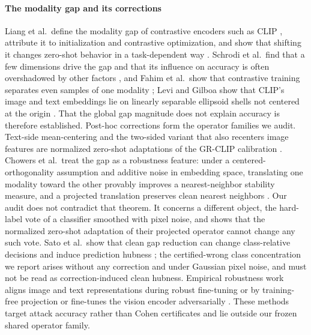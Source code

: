 \paragraph{The modality gap and its corrections}
Liang et al.\ define the modality gap of contrastive encoders such as CLIP \cite{radford2021clip}, attribute it to initialization and contrastive optimization, and show that shifting it changes zero-shot behavior in a task-dependent way \cite{liang2022mind}. Schrodi et al.\ find that a few dimensions drive the gap and that its influence on accuracy is often overshadowed by other factors \cite{schrodi2025twoeffects}, and Fahim et al.\ show that contrastive training separates even samples of one modality \cite{fahim2024contrastive}; Levi and Gilboa show that CLIP's image and text embeddings lie on linearly separable ellipsoid shells not centered at the origin \cite{levi2025double}. That the global gap magnitude does not explain accuracy is therefore established. Post-hoc corrections form the operator families we audit. Text-side mean-centering and the two-sided variant that also recenters image features are normalized zero-shot adaptations of the GR-CLIP calibration \cite{li2025closing}. Chowers et al.\ treat the gap as a robustness feature: under a centered-orthogonality assumption and additive noise in embedding space, translating one modality toward the other provably improves a nearest-neighbor stability measure, and a projected translation preserves clean nearest neighbors \cite{chowers2026bug}. Our audit does not contradict that theorem. It concerns a different object, the hard-label vote of a classifier smoothed with pixel noise, and shows that the normalized zero-shot adaptation of their projected operator cannot change any such vote. Sato et al.\ show that clean gap reduction can change class-relative decisions and induce prediction hubness \cite{sato2026hubness}; the certified-wrong class concentration we report arises without any correction and under Gaussian pixel noise, and must not be read as correction-induced clean hubness. Empirical robustness work aligns image and text representations during robust fine-tuning or by training-free projection \cite{dong2025stabilizing,zhu2025cola,dong2025pathsimplices,dong2025subspaces} or fine-tunes the vision encoder adversarially \cite{schlarmann2024robustclip}. These methods target attack accuracy rather than Cohen certificates and lie outside our frozen shared operator family.

